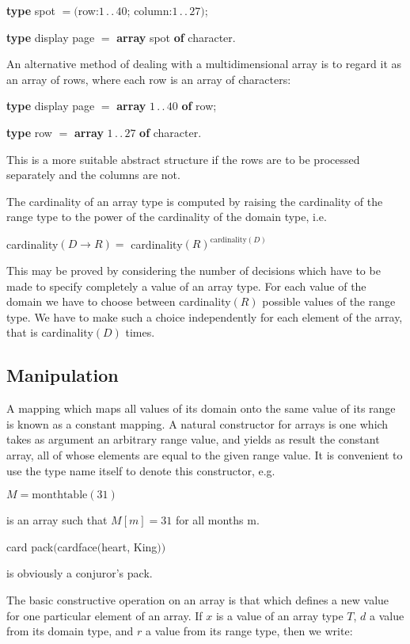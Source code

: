 \quad \textbf{type} spot $= ($row:$1\,.\,.\,40$; column:$1\,.\,.\,27)$;

\quad \textbf{type} display page $=$ \textbf{array} spot \textbf{of} character.

An alternative method of dealing with a multidimensional array is to regard it as an array of rows, where each row is an array of characters:

\quad \textbf{type} display page $=$ \textbf{array} $1\,.\,.\,40$ \textbf{of} row;

\quad \textbf{type} row $=$ \textbf{array} $1\,.\,.\,27$ \textbf{of} character.

\noindent
This is a more suitable abstract structure if the rows are to be processed separately and the columns are not.

The cardinality of an array type is computed by raising the cardinality of the range type to the power of the cardinality of the domain type, i.e.

\quad cardinality$(D \rightarrow R) =$ cardinality$(R)^{\text{cardinality}(D)}$

\noindent
This may be proved by considering the number of decisions which have to be made to specify completely a value of an array type. For each value of the domain we have to choose between cardinality$(R)$ possible values of the range type. We have to make such a choice independently for each element of the array, that is cardinality$(D)$ times.

\subsection{Manipulation}

A mapping which maps all values of its domain onto the same value of its range is known as a constant mapping. A natural constructor for arrays is one which takes as argument an arbitrary range value, and yields as result the constant array, all of whose elements are equal to the given range value. It is convenient to use the type name itself to denote this constructor, e.g.

\quad $M = \text{monthtable}(31)$

\noindent
is an array such that $M[m] = 31$ for all months m.

\quad card pack$($cardface$($heart, King$))$

\noindent
is obviously a conjuror's pack.

The basic constructive operation on an array is that which defines a new value for one particular element of an array. If $x$ is a value of an array type $T$, $d$ a value from its domain type, and $r$ a value from its range type, then we write:

